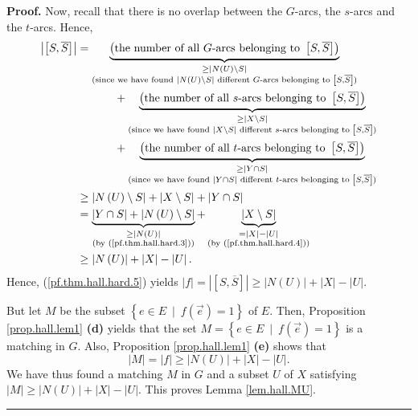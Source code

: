 \documentclass[numbers=enddot,12pt,final,onecolumn,notitlepage]{scrartcl}%
\theoremstyle{definition}
\newenvironment{proof}[1][Proof]{\noindent\textbf{#1.} }{\ \rule{0.5em}{0.5em}}
\begin{document}
\begin{proof}
Now, recall that there is no overlap between the $G$-arcs, the $s$-arcs and
the $t$-arcs. Hence,%
\begin{align*}
\left\vert \left[  S,\overline{S}\right]  \right\vert  &  =\underbrace{\left(
\text{the number of all }G\text{-arcs belonging to }\left[  S,\overline
{S}\right]  \right)  }_{\substack{\geq\left\vert N\left(  U\right)  \setminus
S\right\vert \\\text{(since we have found }\left\vert N\left(  U\right)
\setminus S\right\vert \text{ different }G\text{-arcs belonging to }\left[
S,\overline{S}\right]  \text{)}}}\\
&  \ \ \ \ \ \ \ \ \ \ +\underbrace{\left(  \text{the number of all
}s\text{-arcs belonging to }\left[  S,\overline{S}\right]  \right)
}_{\substack{\geq\left\vert X\setminus S\right\vert \\\text{(since we have
found }\left\vert X\setminus S\right\vert \text{ different }s\text{-arcs
belonging to }\left[  S,\overline{S}\right]  \text{)}}}\\
&  \ \ \ \ \ \ \ \ \ \ +\underbrace{\left(  \text{the number of all
}t\text{-arcs belonging to }\left[  S,\overline{S}\right]  \right)
}_{\substack{\geq\left\vert Y\cap S\right\vert \\\text{(since we have found
}\left\vert Y\cap S\right\vert \text{ different }t\text{-arcs belonging to
}\left[  S,\overline{S}\right]  \text{)}}}\\
&  \geq\left\vert N\left(  U\right)  \setminus S\right\vert +\left\vert
X\setminus S\right\vert +\left\vert Y\cap S\right\vert \\
&  =\underbrace{\left\vert Y\cap S\right\vert +\left\vert N\left(  U\right)
\setminus S\right\vert }_{\substack{\geq\left\vert N\left(  U\right)
\right\vert \\\text{(by (\ref{pf.thm.hall.hard.3}))}}}+\underbrace{\left\vert
X\setminus S\right\vert }_{\substack{=\left\vert X\right\vert -\left\vert
U\right\vert \\\text{(by (\ref{pf.thm.hall.hard.4}))}}}\\
&  \geq\left\vert N\left(  U\right)  \right\vert +\left\vert X\right\vert
-\left\vert U\right\vert .
\end{align*}
Hence, (\ref{pf.thm.hall.hard.5}) yields $\left\vert f\right\vert =\left\vert
\left[  S,\overline{S}\right]  \right\vert \geq\left\vert N\left(  U\right)
\right\vert +\left\vert X\right\vert -\left\vert U\right\vert $.

But let $M$ be the subset $\left\{  e\in E\ \mid\ f\left(  \overrightarrow{e}%
\right)  =1\right\}  $ of $E$. Then, Proposition \ref{prop.hall.lem1}
\textbf{(d)} yields that the set $M=\left\{  e\in E\ \mid\ f\left(
\overrightarrow{e}\right)  =1\right\}  $ is a matching in $G$. Also,
Proposition \ref{prop.hall.lem1} \textbf{(e)} shows that
\[
\left\vert M\right\vert =\left\vert f\right\vert \geq\left\vert N\left(
U\right)  \right\vert +\left\vert X\right\vert -\left\vert U\right\vert .
\]
We have thus found a matching $M$ in $G$ and a subset $U$ of $X$ satisfying
$\left\vert M\right\vert \geq\left\vert N\left(  U\right)  \right\vert
+\left\vert X\right\vert -\left\vert U\right\vert $. This proves Lemma
\ref{lem.hall.MU}.
\end{proof}
\end{document}

